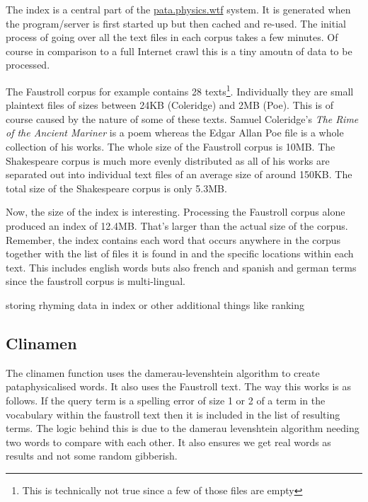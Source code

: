 The index is a central part of the \url{pata.physics.wtf} system. It is generated when the program/server is first started up but then cached and re-used. The initial process of going over all the text files in each corpus takes a few minutes. Of course in comparison to a full Internet crawl this is a tiny amoutn of data to be processed. 

The Faustroll corpus for example contains 28 texts\footnote{This is technically not true since a few of those files are empty}. Individually they are small plaintext files of sizes between 24KB (Coleridge) and 2MB (Poe). This is of course caused by the nature of some of these texts. Samuel Coleridge's \textit{The Rime of the Ancient Mariner} is a poem whereas the Edgar Allan Poe file is a whole collection of his works. The whole size of the Faustroll corpus is 10MB. The Shakespeare corpus is much more evenly distributed as all of his works are separated out into individual text files of an average size of around 150KB. The total size of the Shakespeare corpus is only 5.3MB.

Now, the size of the index is interesting. Processing the Faustroll corpus alone produced an index of 12.4MB. That's larger than the actual size of the corpus. Remember, the index contains each word that occurs anywhere in the corpus together with the list of files it is found in and the specific locations within each text. This includes english words buts also french and spanish and german terms since the faustroll corpus is multi-lingual.


storing rhyming data in index or other additional things like ranking


\subsection{Clinamen}

The clinamen function uses the damerau-levenshtein algorithm to create pataphysicalised words. It also uses the Faustroll text. The way this works is as follows. If the query term is a spelling error of size 1 or 2 of a term in the vocabulary within the faustroll text then it is included in the list of resulting terms. The logic behind this is due to the damerau levenshtein algorithm needing two words to compare with each other. It also ensures we get real words as results and not some random gibberish.

